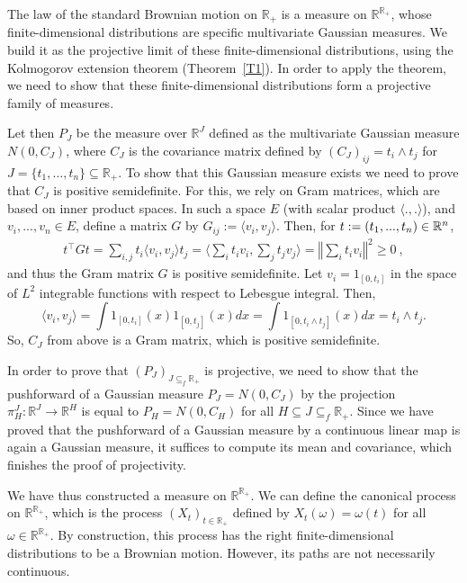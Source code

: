 \documentclass[lean]{Draft}
\begin{document}
The law of the standard Brownian motion on $\mathbb{R}_+$ is a measure on $\mathbb{R}^{\mathbb{R}_+}$, whose finite-dimensional distributions are specific multivariate Gaussian measures.
We build it as the projective limit of these finite-dimensional distributions, using the Kolmogorov extension theorem (Theorem~\ref{T1}).
In order to apply the theorem, we need to show that these finite-dimensional distributions form a projective family of measures.

Let then $P_J$ be the measure over $\mathbb{R}^J$ defined as the multivariate Gaussian measure $N(0, C_J)$, where $C_J$ is the covariance matrix defined by $(C_J)_{ij} = t_i \wedge t_j$ for $J = \{t_1, \dots, t_n\} \subseteq \mathbb{R}_+$.
To show that this Gaussian measure exists we need to prove that $C_J$ is positive semidefinite.
For this, we rely on Gram matrices, which are based on inner product spaces. In such a space $E$ (with scalar product $\langle .,. \rangle$), and $v_i,...,v_n \in E$, define a matrix $G$ by $G_{ij} := \langle v_i, v_j\rangle$.
Then, for $t :=(t_1,...,t_n) \in \mathbb{R}^n$,
\begin{align*}
  t^\top G t = \sum_{i,j} t_i \langle v_i, v_j\rangle t_j = \Big\langle \sum_i t_i v_i, \sum_j t_j v_j\Big\rangle = \left\Vert \sum_i t_i v_i \right\Vert^2 \geq 0
  \: ,
\end{align*}
and thus the Gram matrix $G$ is positive semidefinite.
Let $v_i = 1_{[0,t_i]}$ in the space of $L^2$ integrable functions with respect to Lebesgue integral. Then,
$$ \langle v_i, v_j \rangle = \int 1_{[0,t_i]}(x) 1_{[0,t_j]}(x) dx = \int 1_{[0,t_i \wedge t_j]}(x) dx = t_i \wedge t_j.$$
So, $C_J$ from above is a Gram matrix, which is positive semidefinite.

In order to prove that $(P_J)_{J \subseteq_f \mathbb{R}_+}$ is projective, we need to show that the pushforward of a Gaussian measure $P_J = N(0, C_J)$ by the projection $\pi_H^J : \mathbb{R}^J \to \mathbb{R}^H$ is equal to $P_H = N(0, C_H)$ for all $H \subseteq J \subseteq_f \mathbb{R}_+$.
Since we have proved that the pushforward of a Gaussian measure by a continuous linear map is again a Gaussian measure, it suffices to compute its mean and covariance, which finishes the proof of projectivity.

We have thus constructed a measure on $\mathbb{R}^{\mathbb{R}_+}$.
We can define the canonical process on $\mathbb{R}^{\mathbb{R}_+}$, which is the process $(X_t)_{t \in \mathbb{R}_+}$ defined by $X_t(\omega) = \omega(t)$ for all $\omega \in \mathbb{R}^{\mathbb{R}_+}$.
By construction, this process has the right finite-dimensional distributions to be a Brownian motion.
However, its paths are not necessarily continuous.
\end{document}
